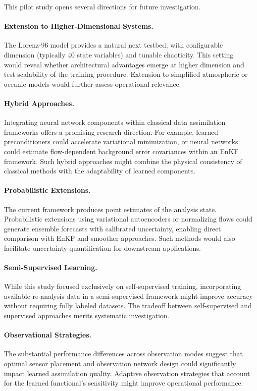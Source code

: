\documentclass[12pt,a4paper]{article}
\begin{document}
\noindent
This pilot study opens several directions for future investigation.

\paragraph{Extension to Higher-Dimensional Systems.} The Lorenz-96 model \cite{lorenz_1963} provides a natural next testbed, with configurable dimension (typically 40 state variables) and tunable chaoticity. This setting would reveal whether architectural advantages emerge at higher dimension and test scalability of the training procedure. Extension to simplified atmospheric or oceanic models would further assess operational relevance.

\paragraph{Hybrid Approaches.} Integrating neural network components within classical data assimilation frameworks offers a promising research direction. For example, learned preconditioners could accelerate variational minimization, or neural networks could estimate flow-dependent background error covariances within an EnKF framework. Such hybrid approaches might combine the physical consistency of classical methods with the adaptability of learned components.

\paragraph{Probabilistic Extensions.} The current framework produces point estimates of the analysis state. Probabilistic extensions using variational autoencoders or normalizing flows could generate ensemble forecasts with calibrated uncertainty, enabling direct comparison with EnKF and smoother approaches. Such methods would also facilitate uncertainty quantification for downstream applications.

\paragraph{Semi-Supervised Learning.} While this study focused exclusively on self-supervised training, incorporating available re-analysis data in a semi-supervised framework might improve accuracy without requiring fully labeled datasets. The tradeoff between self-supervised and supervised approaches merits systematic investigation.

\paragraph{Observational Strategies.} The substantial performance differences across observation modes suggest that optimal sensor placement and observation network design could significantly impact learned assimilation quality. Adaptive observation strategies that account for the learned functional's sensitivity might improve operational performance.
\end{document}
